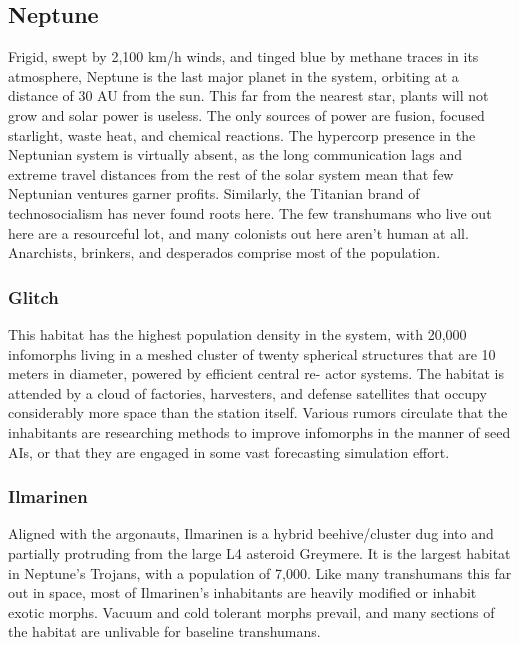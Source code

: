 \subsection{Neptune}

Frigid, swept by 2,100 km/h winds, and tinged blue by 
methane traces in its atmosphere, Neptune is the last 
major planet in the system, orbiting at a distance of 30 
AU from the sun. This far from the nearest star, plants 
will not grow and solar power is useless. The only 
sources of power are fusion, focused starlight, waste 
heat, and chemical reactions. The hypercorp presence 
in the Neptunian system is virtually absent, as the long 
communication lags and extreme travel distances from 
the rest of the solar system mean that few Neptunian 
ventures garner profits. Similarly, the Titanian brand 
of technosocialism has never found roots here. The 
few transhumans who live out here are a resourceful 
lot, and many colonists out here aren't human at all. 
Anarchists, brinkers, and desperados comprise most 
of the population.

\subsubsection{Glitch}

This habitat has the highest population density in the 
system, with 20,000 infomorphs living in a meshed 
cluster of twenty spherical structures that are 10 
meters in diameter, powered by efficient central re-
actor systems. The habitat is attended by a cloud of 
factories, harvesters, and defense satellites that occupy 
considerably more space than the station itself. Various 
rumors circulate that the inhabitants are researching 
methods to improve infomorphs in the manner of seed 
AIs, or that they are engaged in some vast forecasting 
simulation effort.

\subsubsection{Ilmarinen}

Aligned with the argonauts, Ilmarinen is a hybrid 
beehive/cluster dug into and partially protruding 
from the large L4 asteroid Greymere. It is the largest 
habitat in Neptune's Trojans, with a population of 
7,000. Like many transhumans this far out in space, 
most of Ilmarinen's inhabitants are heavily modified 
or inhabit exotic morphs. Vacuum and cold tolerant 
morphs prevail, and many sections of the habitat are 
unlivable for baseline transhumans.

